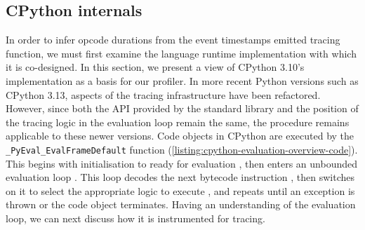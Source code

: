 \subsection{CPython internals}
\label{ssec:profiling-bytecode-cpython-internals}

In order to infer opcode durations from the event timestamps emitted tracing function, we must first examine the language runtime implementation with which it is co-designed. In this section, we present a view of CPython 3.10's implementation as a basis for our profiler.
In more recent Python versions such as CPython 3.13, aspects of the tracing infrastructure have been refactored. However, since both the API provided by the standard library and the position of the tracing logic in the evaluation loop remain the same, the procedure remains applicable to these newer versions.
Code objects in CPython are executed by the \texttt{\_PyEval\_EvalFrameDefault} function (\autoref{listing:cpython-evaluation-overview-code}). This begins with initialisation to ready for evaluation , then enters an unbounded evaluation loop . This loop decodes the next bytecode instruction , then switches on it to select the appropriate logic to execute , and repeats until an exception is thrown or the code object terminates.
Having an understanding of the evaluation loop, we can next discuss how it is instrumented for tracing.

